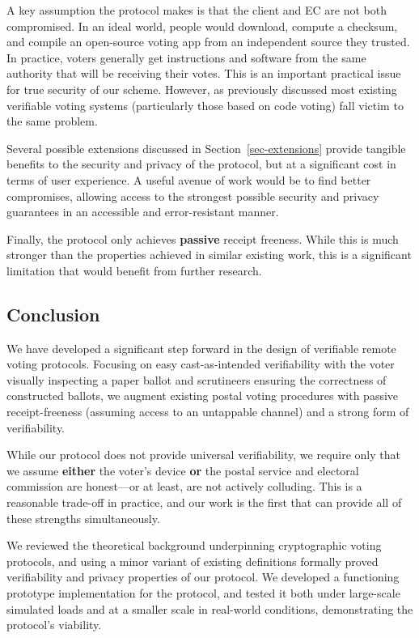 \documentclass[12pt,a4paper]{article}
\theoremstyle{definition}
\begin{document}
A key assumption the protocol makes is that the client and EC are not both compromised. In an ideal world, people would download, compute a checksum, and compile an open-source voting app from an independent source they  trusted. In practice, voters generally get instructions and software from the same authority that will be receiving their votes. This is an important practical issue for true security of our scheme. However, as previously discussed most existing verifiable voting systems (particularly those based on code voting) fall victim to the same problem.

Several possible extensions discussed in Section~\ref{sec-extensions} provide tangible benefits to the security and privacy of the protocol, but at a significant cost in terms of user experience. A useful avenue of work would be to find better compromises, allowing access to the strongest possible security and privacy guarantees in an accessible and error-resistant manner.

Finally, the protocol only achieves \textbf{passive} receipt freeness. While this is much stronger than the properties achieved in similar existing work, this is a significant limitation that would benefit from further research.
\subsection{Conclusion}
We have developed a significant step forward in the design of verifiable remote voting protocols. Focusing on easy cast-as-intended verifiability with the voter visually inspecting a paper ballot and scrutineers ensuring the correctness of constructed ballots, we augment existing postal voting procedures with passive receipt-freeness (assuming access to an untappable channel) and a strong form of verifiability.

While our protocol does not provide universal verifiability, we require only that we assume \textbf{either} the voter's device \textbf{or} the postal service and electoral commission are honest---or at least, are not actively colluding. This is a reasonable trade-off in practice, and our work is the first that can provide all of these strengths simultaneously.

We reviewed the theoretical background underpinning cryptographic voting protocols, and using a minor variant of existing definitions formally proved verifiability and privacy properties of our protocol. We developed a functioning prototype implementation for the protocol, and tested it both under large-scale simulated loads and at a smaller scale in real-world conditions, demonstrating the protocol's viability. 
\end{document}
